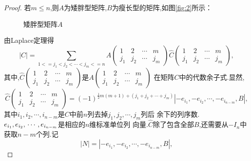 \begin{proof}
若$m \le n$,则$A$为矮胖型矩阵,$B$为瘦长型的矩阵,如图\eqref{fig:2}所示：

  \begin{figure}[!ht]
   \begin{center}
  \end{center}
  \caption{矮胖型矩阵$A$\label{fig:2}}
\end{figure}
由Laplace定理得
\begin{equation}\label{eq:1}
  |C|= \sum\limits_{1<=j_1<j_2<\cdots<j_m<=n}
  A\left(\begin{smallmatrix}
      1 & 2 & \cdots & m \\
      j_1 & j_2 & \cdots & j_m \end{smallmatrix}\right)
  \hat C\left(\begin{smallmatrix}
      1 & 2 & \cdots & m \\
      j_1 & j_2 & \cdots & j_m
    \end{smallmatrix}\right),
\end{equation}
其中,$\hat C\left(\begin{smallmatrix}
      1 & 2 & \cdots & m \\
      j_1 & j_2 & \cdots & j_m
      \end{smallmatrix}\right)$是$A\left(\begin{smallmatrix}
      1 & 2 & \cdots & m \\
      j_1 & j_2 & \cdots & j_m \end{smallmatrix}\right)$
  在矩阵$C$中的代数余子式.显然,
  \begin{equation}\label{eq:2}
    \hat C\left(\begin{smallmatrix}
      1 & 2 & \cdots & m \\
      j_1 & j_2 & \cdots & j_m
    \end{smallmatrix}\right)=(-1)^{\frac{1}{2}m(m+1)+(j_1+j_2+\cdots+j_m)}%
  |-e_{i_1},-e_{i_2},\cdots,-e_{i_{n-m}},B|,
  \end{equation}
  其中$i_1,i_2,\cdots,i_{n-m}$是$C$中前$n$列去掉$j_1,j_2,\cdots,j_m$列后
  余下的列序数.$e_{i_1},e_{i_2},\\\cdots,e_{i_{n-m}}$是相应的$n$维标准单位列
  向量.$\hat C$除了包含全部$B$,还需要从$-I_n$中获取$n-m$个列.记
  \[
    |N|=|-e_{i_1},-e_{i_2},\cdots,-e_{i_{n-m}},B|,
  \]


\end{proof}
